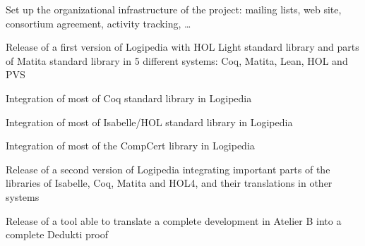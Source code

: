 \begin{milestones}
    {Set up the organizational infrastructure of the project: mailing lists, web site, consortium agreement, activity tracking, \ldots}

     {Release of a first version of Logipedia with HOL Light standard library and parts of Matita standard library in 5 different systems: Coq, Matita, Lean, HOL and PVS}

     {Integration of most of Coq standard library in Logipedia}

     {Integration of most of Isabelle/HOL standard library in Logipedia}

     {Integration of most of the CompCert library in Logipedia}

     {Release of a second version of Logipedia integrating important parts of the libraries of Isabelle, Coq, Matita and HOL4, and their translations in other systems}

     {Release of a tool able to translate a complete development in Atelier B into a complete Dedukti proof}

\end{milestones}
